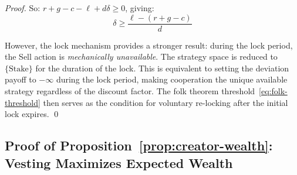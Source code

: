 \begin{proof}
So: $r + g - c - \ell + d\delta \geq 0$, giving:
\begin{equation}
  \delta \geq \frac{\ell - (r + g - c)}{d}
\end{equation}

However, the \veCORTEX{} lock mechanism provides a stronger result: during
the lock period, the Sell action is \emph{mechanically unavailable}. The
strategy space is reduced to $\{\text{Stake}\}$ for the duration of the lock.
This is equivalent to setting the deviation payoff to $-\infty$ during the
lock period, making cooperation the unique available strategy regardless of
the discount factor. The folk theorem threshold~\eqref{eq:folk-threshold}
then serves as the condition for voluntary re-locking after the initial lock
expires. \qed
\end{proof}

\subsection{Proof of Proposition~\ref{prop:creator-wealth}: Vesting Maximizes Expected Wealth}

